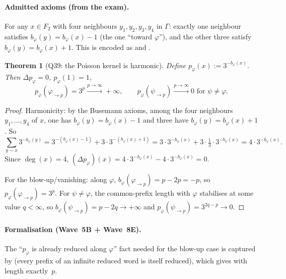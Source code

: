 \documentclass[11pt,a4paper]{article}
\newcommand{\Adj}{\sim}
\renewcommand{\deg}{\operatorname{deg}}
\newcommand{\busem}{b}
\newcommand{\poiss}{p}
\theoremstyle{plain}
\newtheorem{theorem}{Theorem}[section]
\theoremstyle{definition}
\begin{document}
\paragraph{Admitted axioms (from the exam).}
For any $x \in F_2$ with four neighbours $y_1, y_2, y_3, y_4$ in $\Gamma$:
exactly one neighbour satisfies $\busem_\varphi(y) = \busem_\varphi(x) - 1$
(the one ``toward $\varphi$''), and the other three satisfy
$\busem_\varphi(y) = \busem_\varphi(x) + 1$. This is encoded as
 and
.

\begin{theorem}[Q39: the Poisson kernel is harmonic]
Define $\poiss_\varphi(x) := 3^{-\busem_\varphi(x)}$. Then
$\Delta \poiss_\varphi = 0$, $\poiss_\varphi(1) = 1$,
\[ \poiss_\varphi(\varphi_{\to p}) = 3^p \xrightarrow{p \to \infty} +\infty,
   \qquad
   \poiss_\varphi(\psi_{\to p}) \xrightarrow{p \to \infty} 0 \text{ for } \psi \neq \varphi.
\]
\end{theorem}

\begin{proof}
Harmonicity: by the Busemann axioms, among the four neighbours
$y_1, \ldots, y_4$ of $x$, one has $\busem_\varphi(y) = \busem_\varphi(x) -1$
and three have $\busem_\varphi(y) = \busem_\varphi(x) + 1$. So
\[
\sum_{y \Adj x} 3^{-\busem_\varphi(y)} = 3^{-(\busem_\varphi(x)-1)} +
  3 \cdot 3^{-(\busem_\varphi(x)+1)}
= 3 \cdot 3^{-\busem_\varphi(x)} + 3 \cdot \tfrac13 \cdot 3^{-\busem_\varphi(x)}
= 4 \cdot 3^{-\busem_\varphi(x)}.
\]
Since $\deg(x) = 4$, $(\Delta \poiss_\varphi)(x) = 4 \cdot 3^{-\busem_\varphi(x)}
- 4 \cdot 3^{-\busem_\varphi(x)} = 0$.

For the blow-up/vanishing: along $\varphi$, $\busem_\varphi(\varphi_{\to p})
= p - 2p = -p$, so $\poiss_\varphi(\varphi_{\to p}) = 3^p$. For $\psi \neq
\varphi$, the common-prefix length with $\varphi$ stabilises at some value
$q < \infty$, so $\busem_\varphi(\psi_{\to p}) = p - 2q \to +\infty$
and $\poiss_\varphi(\psi_{\to p}) = 3^{2q - p} \to 0$.
\end{proof}

\paragraph{Formalisation (Wave~5B + Wave~8E).}
The ``$\poiss_\varphi$ is already reduced along $\varphi$'' fact needed
for the blow-up case is captured by
 (every prefix of an infinite reduced word
is itself reduced), which gives
 with
length exactly~$p$.
\end{document}

